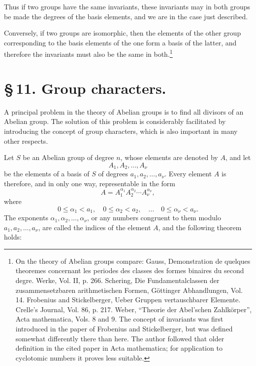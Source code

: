 \documentclass[11pt]{article}
\begin{document}
Thus if two groups have the same invariants, these invariants may in both groups be made the degrees of the basis elements, and we are in the case just described.

Conversely, if two groups are isomorphic, then the elements of the other group corresponding to the basis elements of the one form a basis of the latter, and therefore the invariants must also be the same in both.\footnote{On the theory of Abelian groups compare: Gauss, Demonstration de quelques theoremes concernant les periodes des classes des formes binaires du second degre. Werke, Vol. II, p. 266. Schering, Die Fundamentalclassen der zusammensetzbaren arithmetischen Formen, Göttinger Abhandlungen, Vol. 14. Frobenius and Stickelberger, Ueber Gruppen vertauschbarer Elemente. Crelle's Journal, Vol. 86, p. 217. Weber, ``Theorie der Abel'schen Zahlkörper'', Acta mathematica, Vols. 8 and 9. The concept of invariants was first introduced in the paper of Frobenius and Stickelberger, but was defined somewhat differently there than here. The author followed that older definition in the cited paper in Acta mathematica; for application to cyclotomic numbers it proves less suitable.}

\section*{\S\,11. Group characters.}

A principal problem in the theory of Abelian groups is to find all divisors of an Abelian group. The solution of this problem is considerably facilitated by introducing the concept of group characters, which is also important in many other respects.

Let $S$ be an Abelian group of degree $n$, whose elements are denoted by $A$, and let
\begin{equation}
A_1,A_2,\ldots,A_\nu
\tag{1}
\end{equation}
be the elements of a basis of $S$ of degrees $a_1,a_2,
\ldots,a_\nu$. Every element $A$ is therefore, and in only one way, representable in the form
\begin{equation}
A=A_1^{\alpha_1}A_2^{\alpha_2}\cdots A_\nu^{\alpha_\nu},
\tag{2}
\end{equation}
where
\begin{equation}
0\le \alpha_1<a_1,
\quad 0\le \alpha_2<a_2,
\quad\ldots\quad
0\le \alpha_\nu<a_\nu.
\tag{3}
\end{equation}
The exponents $\alpha_1,\alpha_2,
\ldots,
\alpha_\nu$, or any numbers congruent to them modulo $a_1,a_2,
\ldots,a_\nu$, are called the indices of the element $A$, and the following theorem holds:
\end{document}
